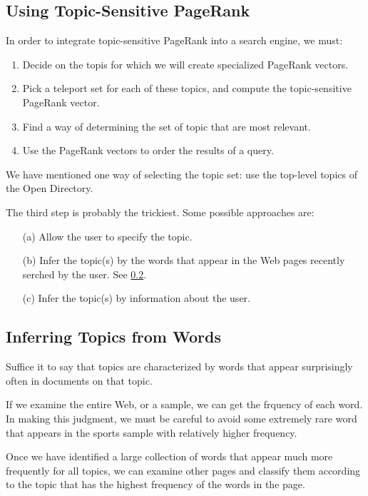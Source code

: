 \subsection{Using Topic-Sensitive PageRank}\label{subsec:using-topic-sensitive-pagerank}

In order to integrate topic-sensitive PageRank into a search engine, we must:
\begin{enumerate}
    \item Decide on the topis for which we will create specialized PageRank vectors.
    \item Pick a teleport set for each of these topics, and compute the topic-sensitive PageRank vector.
    \item Find a way of determining the set of topic that are most relevant.
    \item Use the PageRank vectors to order the results of a query.
\end{enumerate}

\noindent We have mentioned one way of selecting the topic set: use the top-level topics of the Open Directory.

The third step is probably the trickiest. Some possible approaches are:
\begin{itemize}
    \item[(a)] Allow the user to specify the topic.
    \item[(b)] Infer the topic(s) by the words that appear in the Web pages recently serched by the user. See \ref{subsec:inferring-topics-from-words}.
    \item[(c)] Infer the topic(s) by information about the user.
\end{itemize}

\subsection{Inferring Topics from Words}\label{subsec:inferring-topics-from-words}

Suffice it to say that topics are characterized by words that appear surprisingly often in documents on that topic. 

If we examine the entire Web, or a sample, we can get the frquency of each word. In making this judgment, we must be careful to avoid some extremely rare word that appears in the sports sample with relatively higher frequency.  

Once we have identified a large collection of words that appear much more frequently for all topics, we can examine other pages and classify them according to the topic that has the highest frequency of the words in the page.

